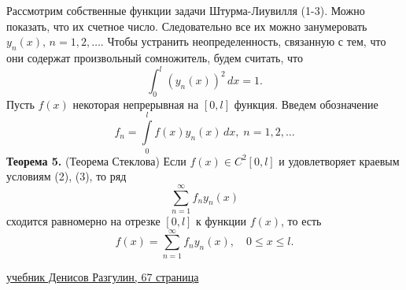 Рассмотрим собственные функции задачи Штурма-Лиувилля (1-3). Можно показать, что их счетное число. Следовательно все их можно занумеровать $y_n(x), \, n = 1, 2, \dots $. Чтобы устранить неопределенность, связанную с тем, что они содержат произвольный сомножитель,
будем считать, что
\begin{equation}
    \int_0^l (y_n(x))^2 \, dx = 1.
\end{equation}
Пусть $f(x)$ некоторая непрерывная на $[0, l]$ функция. Введем обозначение
\begin{equation}
    f_n = \int \limits_0^l f(x) y_n(x) \, dx, \; n=1,2,\dots
\end{equation}
\textbf{Теорема 5.} (Теорема Стеклова) Если $f(x) \in C^2[0, l]$ и удовлетворяет краевым условиям (2), (3), то ряд
\begin{equation}
    \sum \limits_{n=1}^{\infty} f_n y_n(x)
\end{equation}
сходится равномерно на отрезке $[0, l]$ к функции $f(x)$, то есть
\begin{equation}
    f(x) = \sum \limits_{n=1}^{\infty} f_n y_n(x), \quad 0 \leq x \leq l.
\end{equation}

\bigbreak
\href{https://docs.yandex.ru/docs/view?url=ya-disk-public%3A%2F%2FljGJ%2FKUXSQtTRipROZYgmj8jQzsO4AYeV8pj3SCje6DOOVzqfrd3y0zmdcMVc%2BPSq%2FJ6bpmRyOJonT3VoXnDag%3D%3D%3A%2F2%20%D0%BA%D1%83%D1%80%D1%81%2F%D0%94%D0%B8%D1%84%D1%84%D1%83%D1%80%D1%8B%2F1.%20%D0%9A%D0%BD%D0%B8%D0%B3%D0%B8%2F%5B%D1%83%D1%87%D0%B5%D0%B1%D0%BD%D0%B8%D0%BA%20%D1%87.2%5D%20%D0%94%D0%B5%D0%BD%D0%B8%D1%81%D0%BE%D0%B2%20%D0%A0%D0%B0%D0%B7%D0%B3%D1%83%D0%BB%D0%B8%D0%BD%20%D0%9E%D0%94%D0%A3%20-%202.pdf&name=%5B%D1%83%D1%87%D0%B5%D0%B1%D0%BD%D0%B8%D0%BA%20%D1%87.2%5D%20%D0%94%D0%B5%D0%BD%D0%B8%D1%81%D0%BE%D0%B2%20%D0%A0%D0%B0%D0%B7%D0%B3%D1%83%D0%BB%D0%B8%D0%BD%20%D0%9E%D0%94%D0%A3%20-%202.pdf&nosw=1}{учебник Денисов Разгулин, 67 страница}
